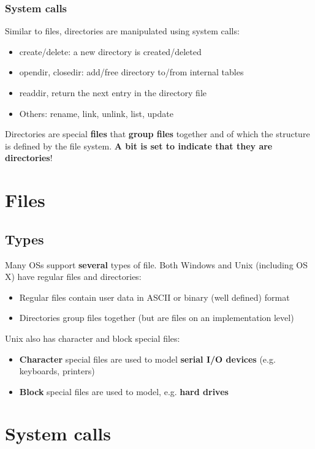 \documentclass{article}
\begin{document}
\subsubsection{System calls}
\begin{flushleft}
Similar to files, directories are manipulated using system calls: 
\begin{itemize}
	\item create/delete: a new directory is created/deleted
	\item opendir, closedir: add/free directory to/from internal tables
	\item readdir, return the next entry in the directory file
	\item Others: rename, link, unlink, list, update 
\end{itemize}
Directories are special \textbf{files} that \textbf{group files} together and of which the structure is defined by the file system. \textbf{A bit is set to indicate that they are directories}!
\end{flushleft}


\section{Files}
\subsection{Types}
\begin{flushleft}
Many OSs support \textbf{several} types of file. Both Windows and Unix (including OS X) have regular files and directories:
\begin{itemize}
	\item Regular files contain user data in ASCII or binary (well defined) format
	\item Directories group files together (but are files on an implementation level)
\end{itemize}
Unix also has character and block special files:
\begin{itemize}
	\item \textbf{Character} special files are used to model \textbf{serial I/O devices} (e.g. keyboards, printers)
	\item \textbf{Block} special files are used to model, e.g. \textbf{hard drives}
\end{itemize}
\end{flushleft}

\section{System calls}
\end{document}
